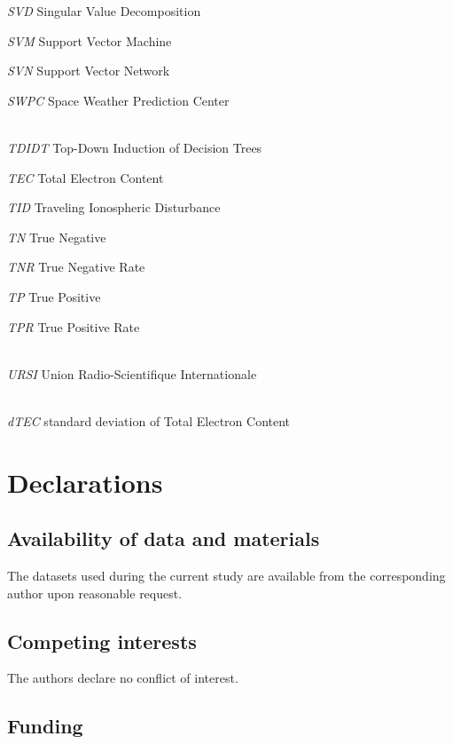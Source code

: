 \documentclass[sn-mathphys-num]{sn-jnl}%
\begin{document}
\textit{SVD} Singular Value Decomposition

\textit{SVM} Support Vector Machine

\textit{SVN} Support Vector Network

\textit{SWPC} Space Weather Prediction Center


\\[2\baselineskip]

\textit{TDIDT} Top-Down Induction of Decision Trees

\textit{TEC} Total Electron Content

\textit{TID} Traveling Ionospheric Disturbance

\textit{TN} True Negative

\textit{TNR} True Negative Rate

\textit{TP} True Positive

\textit{TPR} True Positive Rate


\\[2\baselineskip]

\textit{URSI} Union Radio-Scientifique Internationale


\\[2\baselineskip]

\textit{dTEC} standard deviation of Total Electron Content



\section{Declarations}

\subsection{Availability of data and materials}

The datasets used during the current study are available from the corresponding author upon reasonable request.

\subsection{Competing interests}

The authors declare no conflict of interest.

\subsection{Funding}
\end{document}
